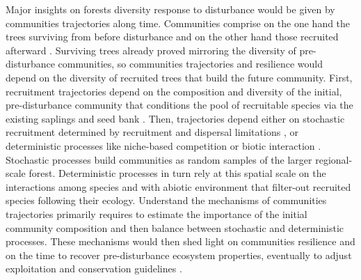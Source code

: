 \documentclass[fleqn,10pt]{ArtEcoFoG} %
\begin{document}
Major insights on forests diversity response to disturbance would be
given by communities trajectories along time. Communities comprise on
the one hand the trees surviving from before disturbance and on the
other hand those recruited afterward \citep{Herault2018}. Surviving
trees already proved mirroring the diversity of pre-disturbance
communities, so communities trajectories and resilience would depend on
the diversity of recruited trees that build the future community. First,
recruitment trajectories depend on the composition and diversity of the
initial, pre-disturbance community that conditions the pool of
recruitable species via the existing saplings and seed bank
\citep{Herault2018}. Then, trajectories depend either on stochastic
recruitment determined by recruitment and dispersal limitations
\citep{Hurtt1995, Hubbell2001}, or deterministic processes like
niche-based competition or biotic interaction \citep{Adler2007}.
Stochastic processes build communities as random samples of the larger
regional-scale forest. Deterministic processes in turn rely at this
spatial scale on the interactions among species and with abiotic
environment that filter-out recruited species following their ecology.
Understand the mechanisms of communities trajectories primarily requires
to estimate the importance of the initial community composition and then
balance between stochastic and deterministic processes. These mechanisms
would then shed light on communities resilience and on the time to
recover pre-disturbance ecosystem properties, eventually to adjust
exploitation and conservation guidelines
\citep{Diaz2005, Gardner2007, Schwartz2017}.
\end{document}

